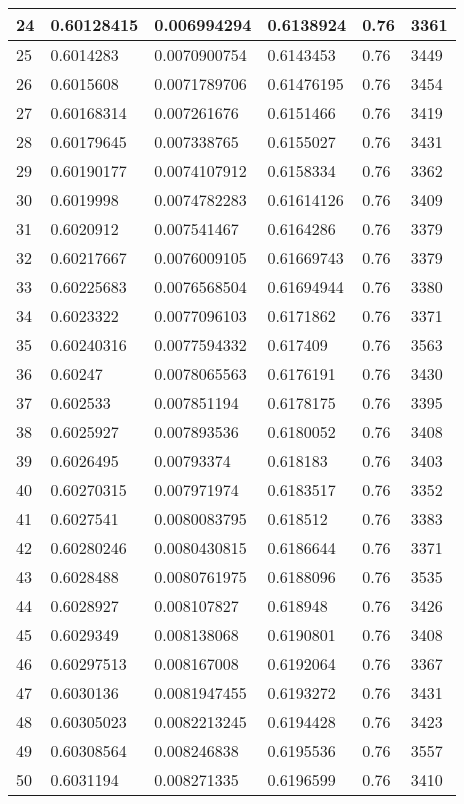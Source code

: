 \begin{longtable}{|l|l|l|l|l|l|}
24 & 0.60128415 & 0.006994294 & 0.6138924 & 0.76 & 3361 \\ \hline 
25 & 0.6014283 & 0.0070900754 & 0.6143453 & 0.76 & 3449 \\ \hline 
26 & 0.6015608 & 0.0071789706 & 0.61476195 & 0.76 & 3454 \\ \hline 
27 & 0.60168314 & 0.007261676 & 0.6151466 & 0.76 & 3419 \\ \hline 
28 & 0.60179645 & 0.007338765 & 0.6155027 & 0.76 & 3431 \\ \hline 
29 & 0.60190177 & 0.0074107912 & 0.6158334 & 0.76 & 3362 \\ \hline 
30 & 0.6019998 & 0.0074782283 & 0.61614126 & 0.76 & 3409 \\ \hline 
31 & 0.6020912 & 0.007541467 & 0.6164286 & 0.76 & 3379 \\ \hline 
32 & 0.60217667 & 0.0076009105 & 0.61669743 & 0.76 & 3379 \\ \hline 
33 & 0.60225683 & 0.0076568504 & 0.61694944 & 0.76 & 3380 \\ \hline 
34 & 0.6023322 & 0.0077096103 & 0.6171862 & 0.76 & 3371 \\ \hline 
35 & 0.60240316 & 0.0077594332 & 0.617409 & 0.76 & 3563 \\ \hline 
36 & 0.60247 & 0.0078065563 & 0.6176191 & 0.76 & 3430 \\ \hline 
37 & 0.602533 & 0.007851194 & 0.6178175 & 0.76 & 3395 \\ \hline 
38 & 0.6025927 & 0.007893536 & 0.6180052 & 0.76 & 3408 \\ \hline 
39 & 0.6026495 & 0.00793374 & 0.618183 & 0.76 & 3403 \\ \hline 
40 & 0.60270315 & 0.007971974 & 0.6183517 & 0.76 & 3352 \\ \hline 
41 & 0.6027541 & 0.0080083795 & 0.618512 & 0.76 & 3383 \\ \hline 
42 & 0.60280246 & 0.0080430815 & 0.6186644 & 0.76 & 3371 \\ \hline 
43 & 0.6028488 & 0.0080761975 & 0.6188096 & 0.76 & 3535 \\ \hline 
44 & 0.6028927 & 0.008107827 & 0.618948 & 0.76 & 3426 \\ \hline 
45 & 0.6029349 & 0.008138068 & 0.6190801 & 0.76 & 3408 \\ \hline 
46 & 0.60297513 & 0.008167008 & 0.6192064 & 0.76 & 3367 \\ \hline 
47 & 0.6030136 & 0.0081947455 & 0.6193272 & 0.76 & 3431 \\ \hline 
48 & 0.60305023 & 0.0082213245 & 0.6194428 & 0.76 & 3423 \\ \hline 
49 & 0.60308564 & 0.008246838 & 0.6195536 & 0.76 & 3557 \\ \hline 
50 & 0.6031194 & 0.008271335 & 0.6196599 & 0.76 & 3410 \\ \hline 
\end{longtable}